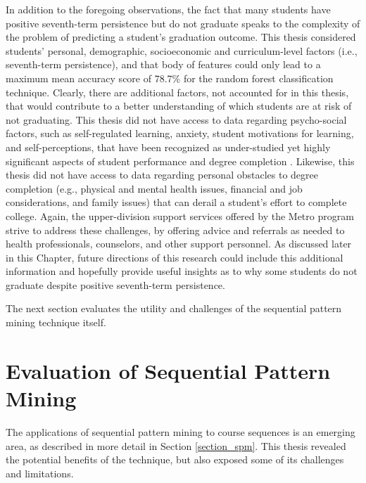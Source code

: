 In addition to the foregoing observations, the fact that many students have positive seventh-term persistence but do not graduate speaks to the complexity of the problem of predicting a student's graduation outcome.  This thesis considered students' personal, demographic, socioeconomic and curriculum-level factors (i.e., seventh-term persistence), and that body of features could only lead to a maximum mean accuracy score of 78.7\% for the random forest classification technique.  Clearly, there are additional factors, not accounted for in this thesis, that would contribute to a better understanding of which students are at risk of not graduating.  This thesis did not have access to data regarding psycho-social factors, such as self-regulated learning, anxiety, student motivations for learning, and self-perceptions, that have been recognized as under-studied yet highly significant aspects of student performance and degree completion \cite{Fong}.  Likewise, this thesis did not have access to data regarding personal obstacles to degree completion (e.g., physical and mental health issues, financial and job considerations, and family issues) that can derail a student's effort to complete college.  Again, the upper-division support services offered by the Metro program strive to address these challenges, by offering advice and referrals as needed to health professionals, counselors, and other support personnel.  As discussed later in this Chapter, future directions of this research could include this additional information and hopefully provide useful insights as to why some students do not graduate despite positive seventh-term persistence. 

The next section evaluates the utility and challenges of the sequential pattern mining technique itself.

\section{Evaluation of Sequential Pattern Mining}

The applications of sequential pattern mining to course sequences is an emerging area, as described in more detail in Section \ref{section_spm}.  This thesis revealed the potential benefits of the technique, but also exposed some of its challenges and limitations.  

